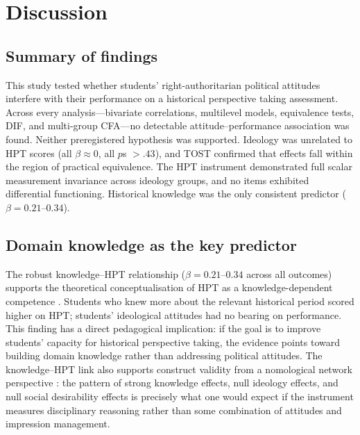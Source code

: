 \documentclass[pdflatex,sn-apa]{sn-jnl}%
\begin{document}

\section{Discussion}\label{sec:discussion}

\subsection{Summary of findings}\label{subsec:summary}

This study tested whether students' right-authoritarian political attitudes interfere with their performance on a historical perspective taking assessment. Across every analysis---bivariate correlations, multilevel models, equivalence tests, DIF, and multi-group CFA---no detectable attitude--performance association was found. Neither preregistered hypothesis was supported. Ideology was unrelated to HPT scores (all $\beta \approx 0$, all $p$s $> .43$), and TOST confirmed that effects fall within the region of practical equivalence. The HPT instrument demonstrated full scalar measurement invariance across ideology groups, and no items exhibited differential functioning. Historical knowledge was the only consistent predictor ($\beta = 0.21$--$0.34$).

\subsection{Domain knowledge as the key predictor}\label{subsec:knowledge}

The robust knowledge--HPT relationship ($\beta = 0.21$--$0.34$ across all outcomes) supports the theoretical conceptualisation of HPT as a knowledge-dependent competence \citep{Hartmann2008, Chapman2021, Wineburg2001}. Students who knew more about the relevant historical period scored higher on HPT; students' ideological attitudes had no bearing on performance. This finding has a direct pedagogical implication: if the goal is to improve students' capacity for historical perspective taking, the evidence points toward building domain knowledge rather than addressing political attitudes. The knowledge--HPT link also supports construct validity from a nomological network perspective \citep{Messick1995}: the pattern of strong knowledge effects, null ideology effects, and null social desirability effects is precisely what one would expect if the instrument measures disciplinary reasoning rather than some combination of attitudes and impression management.
\end{document}
